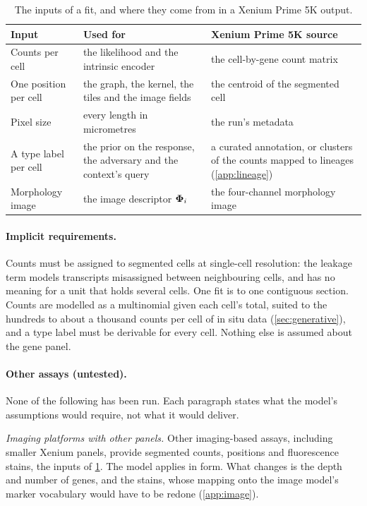 \begin{table}[t]
\centering
\caption{The inputs of a fit, and where they come from in a Xenium Prime 5K output.}
\label{tab:inputs}
\small
\begin{tabular}{@{}>{\raggedright\arraybackslash}p{}>{\raggedright\arraybackslash}p{}>{\raggedright\arraybackslash}p{}@{}}
\toprule
Input & Used for & Xenium Prime 5K source \\
\midrule
Counts per cell & the likelihood and the intrinsic encoder & the cell-by-gene count matrix \\
One position per cell & the graph, the kernel, the tiles and the image fields & the centroid of the segmented cell \\
Pixel size & every length in micrometres & the run's metadata \\
A type label per cell & the prior on the response, the adversary and the context's query & a curated annotation, or clusters of the counts mapped to lineages (\cref{app:lineage}) \\
Morphology image & the image descriptor $\boldsymbol{\Phi}_i$ & the four-channel morphology image \\
\bottomrule
\end{tabular}
\end{table}

\paragraph{Implicit requirements.} Counts must be assigned to segmented cells at single-cell resolution: the leakage term models transcripts misassigned between neighbouring cells, and has no meaning for a unit that holds several cells. One fit is to one contiguous section. Counts are modelled as a multinomial given each cell's total, suited to the hundreds to about a thousand counts per cell of in situ data (\cref{sec:generative}), and a type label must be derivable for every cell. Nothing else is assumed about the gene panel.

\paragraph{Other assays (untested).} None of the following has been run. Each paragraph states what the model's assumptions would require, not what it would deliver.

\emph{Imaging platforms with other panels.} Other imaging-based assays, including smaller Xenium panels, provide segmented counts, positions and fluorescence stains, the inputs of \cref{tab:inputs}. The model applies in form. What changes is the depth and number of genes, and the stains, whose mapping onto the image model's marker vocabulary would have to be redone (\cref{app:image}).

